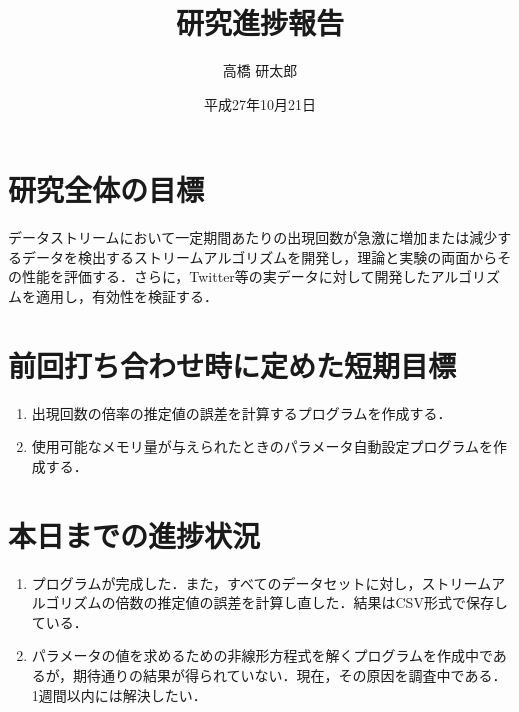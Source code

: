 \documentclass[xelatex,ja=standard,11pt]{bxjsarticle}
\title{研究進捗報告}
\author{高橋 研太郎}
\date{平成27年10月21日}
\begin{document}
%
\maketitle
\thispagestyle{empty}
%
\section{研究全体の目標}
データストリームにおいて一定期間あたりの出現回数が急激に増加または減少するデータを検出するストリームアルゴリズムを開発し，理論と実験の両面からその性能を評価する．さらに，Twitter等の実データに対して開発したアルゴリズムを適用し，有効性を検証する．
\section{前回打ち合わせ時に定めた短期目標}
\begin{enumerate}
\item 出現回数の倍率の推定値の誤差を計算するプログラムを作成する．
\item 使用可能なメモリ量が与えられたときのパラメータ自動設定プログラムを作成する．
\end{enumerate}
\section{本日までの進捗状況}
\begin{enumerate}
\item プログラムが完成した．また，すべてのデータセットに対し，ストリームアルゴリズムの倍数の推定値の誤差を計算し直した．結果はCSV形式で保存している．
\item パラメータの値を求めるための非線形方程式を解くプログラムを作成中であるが，期待通りの結果が得られていない．現在，その原因を調査中である．1週間以内には解決したい．
\end{enumerate}
\end{document}
